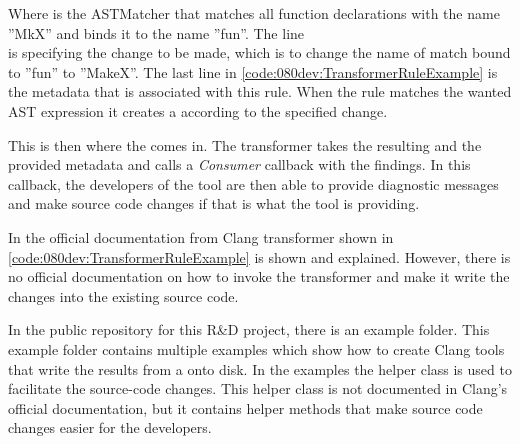 Where  is the ASTMatcher that matches all function declarations with the name ''MkX'' and binds it to the name ''fun''. The line \\ is specifying the change to be made, which is to change the name of match bound to ''fun'' to ''MakeX''. The last line in \cref{code:080dev:TransformerRuleExample} is the metadata that is associated with this rule. When the rule matches the wanted AST expression it creates a  according to the specified change. 

This is then where the  comes in. The transformer takes the resulting  and the provided metadata and calls a \textit{Consumer} callback with the findings. In this callback, the developers of the tool are then able to provide diagnostic messages and make source code changes if that is what the tool is providing.\cite{ClangTransformerTutorial}

In the official documentation from Clang transformer shown in \cref{code:080dev:TransformerRuleExample} is shown and explained. However, there is no official documentation on how to invoke the transformer and make it write the changes into the existing source code. 

In the public repository for this R\&D project, there is an example folder. This example folder contains multiple examples which show how to create Clang tools that write the results from a  onto disk.\cite{kristensenMortenhaahrRD2023} In the examples the  helper class is used to facilitate the source-code changes. This helper class is not documented in Clang's official documentation, but it contains helper methods that make source code changes easier for the developers. 



